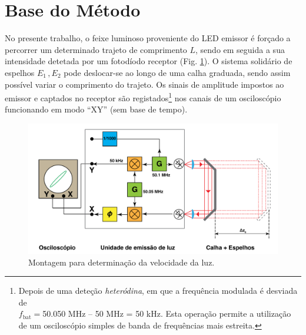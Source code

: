 \documentclass[a4paper,12pt]{article}      %
\begin{document}

\newpage
\section{\sf Base do Método}
No presente trabalho, o feixe luminoso proveniente do LED emissor é forçado a percorrer um determinado trajeto de comprimento $L$, sendo em seguida a sua intensidade  detetada por um fotodíodo receptor (Fig. \ref{fig:Montagem}). O sistema solidário de espelhos $E_1\,, E_2$ pode deslocar-se ao longo de uma calha graduada,
sendo assim possível variar o comprimento do trajeto. Os
sinais de amplitude impostos ao emissor e captados no receptor são registados\footnote{Depois de uma deteção \emph{heteródina}, em que a frequência modulada é desviada de \\ 
$f_{\textrm{bat}}=$50.050 MHz -- 50 MHz  = 50 kHz. Esta operação permite a utilização de um osciloscópio simples de banda de frequências mais estreita.} 
nos canais de um osciloscópio funcionando em modo “XY” (sem base de tempo).

\begin{figure}[htb] 
 \centering 
	\includegraphics[width=01.0\textwidth]{esquema}
	\caption{Montagem para determinação da velocidade da luz. \label{fig:Montagem}} 
\end{figure}
\end{document}
